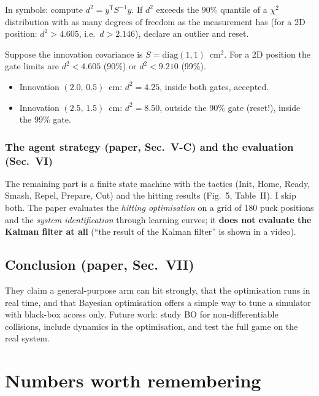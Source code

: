\documentclass[11pt,a4paper]{article}
\begin{document}
In symbols: compute $d^2=y^{\mathsf T}S^{-1}y$. If $d^2$ exceeds the $90\%$ quantile of a
$\chi^2$ distribution with as many degrees of freedom as the measurement has (for a 2D position:
$d^2>4.605$, i.e.\ $d>2.146$), declare an outlier and reset.

\begin{toy}
Suppose the innovation covariance is $S=\mathrm{diag}(1,1)$~cm$^2$. For a 2D position the gate
limits are $d^2<4.605$ (90\%) or $d^2<9.210$ (99\%).
\begin{itemize}
\item Innovation $(2.0,\,0.5)$~cm: $d^2=4.25$, inside both gates, accepted.
\item Innovation $(2.5,\,1.5)$~cm: $d^2=8.50$, outside the 90\% gate (reset!), inside the 99\% gate.
\end{itemize}
\end{toy}

\subsubsection{The agent strategy (paper, Sec.~V-C) and the evaluation (Sec.~VI)}
The remaining part is a finite state machine with the tactics (Init, Home, Ready, Smash, Repel,
Prepare, Cut) and the hitting results (Fig.~5, Table~II). I skip both. The paper evaluates the
\emph{hitting optimisation} on a grid of 180 puck positions and the \emph{system identification}
through learning curves; it \textbf{does not evaluate the Kalman filter at all} (``the result of the
Kalman filter'' is shown in a video).

\subsection{Conclusion (paper, Sec.~VII)}
They claim a general-purpose arm can hit strongly, that the optimisation runs in real time, and
that Bayesian optimisation offers a simple way to tune a simulator with black-box access only.
Future work: study BO for non-differentiable collisions, include dynamics in the optimisation, and
test the full game on the real system.

\section{Numbers worth remembering}
\end{document}
